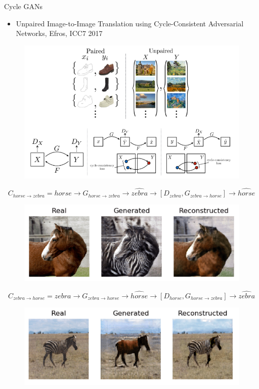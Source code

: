 \begin{frame}[allowframebreaks]{Cycle GANs}

\begin{itemize}
    \item Unpaired Image-to-Image Translation using Cycle-Consistent Adversarial Networks, Efros, ICC7 2017
    
\end{itemize}
\begin{figure}
    \centering
    \includegraphics[height=0.7\textheight, width=\textwidth, keepaspectratio]{images/gan/cycle_gan_1.png}
\end{figure}
\framebreak
$$C_{horse \rightarrow zebra} = horse \rightarrow G_{horse \rightarrow zebra} \rightarrow \hat{zebra} \rightarrow [D_{zebra}, G_{zebra \rightarrow horse}] \rightarrow \hat{horse}$$
\begin{figure}
    \centering
    \includegraphics[height=0.7\textheight, width=\textwidth, keepaspectratio]{images/gan/cycle_gan_2.png}
\end{figure}

\framebreak
$$C_{zebra \rightarrow horse} = zebra \rightarrow G_{zebra \rightarrow horse} \rightarrow \hat{horse} \rightarrow [D_{horse}, G_{horse \rightarrow zebra}] \rightarrow \hat{zebra}$$
\begin{figure}
    \centering
    \includegraphics[height=0.7\textheight, width=\textwidth, keepaspectratio]{images/gan/cycle_gan_3.png}
\end{figure}


\end{frame}
